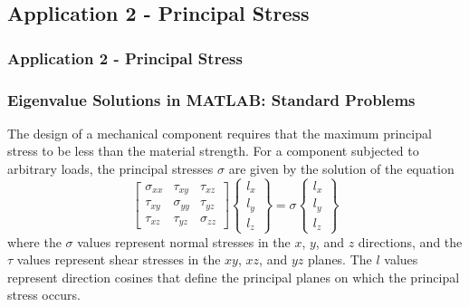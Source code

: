 \documentclass[fleqn]{ltx-talk} %
\newcommand{\sectionIIsubsectionIVtitle}{Application 2 - Principal Stress}
\begin{document}
		\subsection{\sectionIIsubsectionIVtitle}\label{sectionIIsubsectionIV}

			\begin{frame}
				\frametitle{\sectionIIsubsectionIVtitle}
				\bigskip

				\frametitle{Eigenvalue Solutions in MATLAB: Standard Problems}
  
				  The design of a mechanical component requires that the maximum
				  principal stress to be less than the material strength. For a
				  component subjected to arbitrary loads, the principal stresses
				  $\sigma$ are given by the solution of the equation
				  \begin{displaymath}
				    \left[ \begin{array}{ccc}
				        \sigma_{xx} & \tau_{xy} & \tau_{xz} \\
				        \tau_{xy} & \sigma_{yy} & \tau_{yz} \\
				        \tau_{xz} & \tau_{yz} & \sigma_{zz}
				    \end{array} \right]
				    \left\{ \begin{array}{c}
				        l_x \\
				        l_y \\
				        l_z
				      \end{array} \right\} =
				    \sigma
				    \left\{ \begin{array}{c}
				        l_x \\
				        l_y \\
				        l_z
				      \end{array} \right\}
				  \end{displaymath}
				  where the $\sigma$ values represent normal stresses in the $x$, $y$,
				  and $z$ directions, and the $\tau$ values represent shear stresses
				  in the $xy$, $xz$, and $yz$ planes. The $l$ values represent
				  direction cosines that define the principal planes on which the
				  principal stress occurs.

				\btVFill 
			\end{frame}
\end{document}
